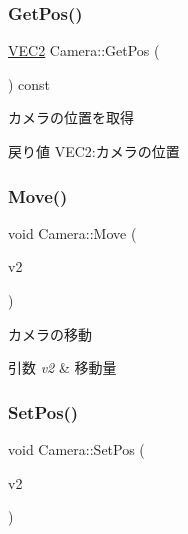 \subsubsection{\texorpdfstring{Get\+Pos()}{GetPos()}}
{\footnotesize\ttfamily \mbox{\hyperlink{common_8h_afb0c5e21d4133ff4f200992c0b534e1b}{V\+E\+C2}} Camera\+::\+Get\+Pos (\begin{DoxyParamCaption}{ }\end{DoxyParamCaption}) const}



カメラの位置を取得 

\begin{DoxyReturn}{戻り値}
V\+E\+C2\+:カメラの位置 
\end{DoxyReturn}
\mbox{\label{class_camera_a5c6b7ad424d835a3022393099886a90b}} 
\subsubsection{\texorpdfstring{Move()}{Move()}}
{\footnotesize\ttfamily void Camera\+::\+Move (\begin{DoxyParamCaption}\item[{const \mbox{\hyperlink{common_8h_afb0c5e21d4133ff4f200992c0b534e1b}{V\+E\+C2}} \&}]{v2 }\end{DoxyParamCaption})}



カメラの移動 


\begin{DoxyParams}{引数}
{\em v2} & 移動量 \\
\hline
\end{DoxyParams}
\mbox{\label{class_camera_af79aa3fedd030712e7fa122a2ea88b48}} 
\subsubsection{\texorpdfstring{Set\+Pos()}{SetPos()}}
{\footnotesize\ttfamily void Camera\+::\+Set\+Pos (\begin{DoxyParamCaption}\item[{const \mbox{\hyperlink{common_8h_afb0c5e21d4133ff4f200992c0b534e1b}{V\+E\+C2}} \&}]{v2 }\end{DoxyParamCaption})}



